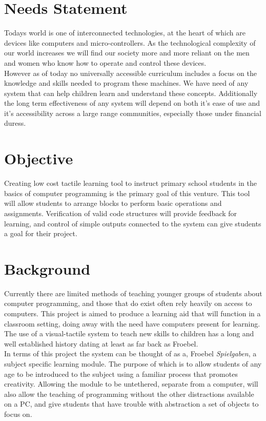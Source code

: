 \section{Needs Statement}
Todays world is one of interconnected technologies, at the heart of which are devices like computers and micro-controllers. As the technological complexity of our world increases we will find our society more and more reliant on the men and women who know how to operate and control these devices.\\


However as of today no universally accessible curriculum includes a focus on the knowledge and skills needed to program these machines. We have need of any system that can help children learn and understand these concepts. Additionally  the long term effectiveness of any system will depend on both it's ease of use and it's accessibility across a large range communities, especially those under financial duress.
\newpage

\section{Objective}
Creating low cost tactile learning tool to instruct primary school students in the basics of computer programming is the primary goal of this venture. This tool will allow students to arrange blocks to perform basic operations and assignments. Verification of valid code structures will provide feedback for learning, and control of simple outputs connected to the system can give students a goal for their project.

\section{Background}

Currently there are limited methods of teaching  younger groups of students about computer programming, and those that do exist often rely heavily on access to computers. This project is aimed to produce a learning aid that will function in a classroom setting, doing away with the need have computers present for learning. 
The use of a visual-tactile system to teach new skills to children has a long and well established history dating at least as far back as Froebel.\\

 In terms of this project the system can be thought of as a, Froebel \textit{Spielgaben}, a subject specific learning module. The purpose of which is to allow students of any age to be introduced to the subject using a familiar process that promotes creativity. Allowing the module to be untethered, separate from a computer, will also allow the teaching of programming without the other distractions available on a PC, and give students that have trouble with abstraction a set of objects to focus on.

